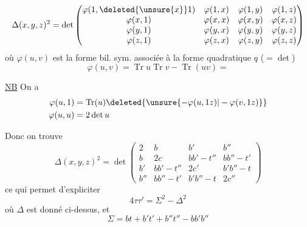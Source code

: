 \[
 \Delta(x,y,z)^2=\det\begin{pmatrix}
 \varphi(1,\deleted{\unsure{x}}1)&\varphi(1,x)&\varphi(1,y)&\varphi(1,z)\\
 \varphi(x,1)&\varphi(x,x)&\varphi(x,y)&\varphi(x,z)\\
 \varphi(y,1)&\varphi(y,x)&\varphi(y,y)&\varphi(y,z)\\
 \varphi(z,1)&\varphi(z,x)&\varphi(z,y)&\varphi(z,z)
 \end{pmatrix}
\]
où $\varphi(u,v)$ est la forme bil. sym. associée à la forme quadratique $q$ ($=\det$)
\[
 \varphi(u,v)=\operatorname{Tr}u\operatorname{Tr}v-\operatorname{Tr}(uv)=
\]

\uline{NB} On a
\[
 \begin{aligned}
 \varphi(u,1)&=\operatorname{Tr}(u)\deleted{\unsure{-\varphi(u,1z)|-\varphi(v,1z)}}\\
 \varphi(u,u)&=2\det u
 \end{aligned}
\]

Donc on trouve
\[
 \boxed{\Delta(x,y,z)^2=\det\begin{pmatrix}
 2&b&b'&b''\\
 b&2c&bb'-t''&bb''-t'\\
 b'&bb'-t''&2c'&b'b''-t\\
 b''&bb''-t'&b'b''-t&2c''
 \end{pmatrix}}
\]
ce qui permet d'expliciter
\[
 4\tau\tau'=\Sigma^2-\Delta^2
\]
où $\Delta$ est donné ci-dessus, et
\[
 \boxed{\Sigma=bt+b't'+b''t''-bb'b''}
\]
